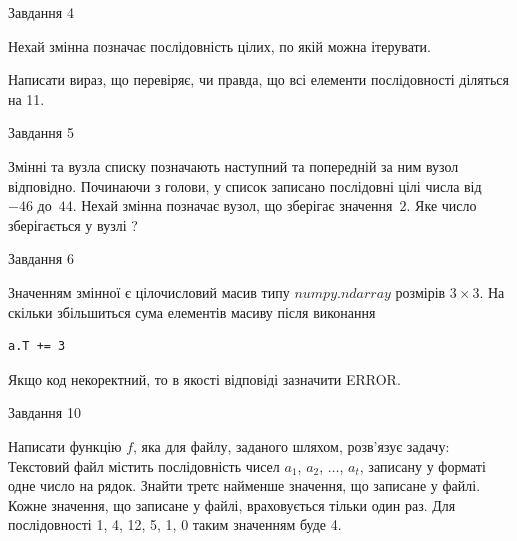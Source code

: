 \documentclass[12pt, ukrainian]{article}
\begin{document}
{\begin{minipage}[t]{8.0cm}
\end{minipage}


               
{\begin{center}Завдання {4}\end{center}}
\vspace{-4mm}
Нехай змінна  позначає послідовність цілих, по якій можна ітерувати.

Написати вираз, що перевіряє, чи правда, що всі елементи послідовності діляться на 11.\par

\vspace{10mm}
               
{\begin{center}Завдання {5}\end{center}}
\vspace{-4mm}
Змінні  та  вузла списку позначають наступний та попередній за ним вузол відповідно. Починаючи з голови, у список записано послідовні цілі числа від~$-46$ до~$44$. Нехай змінна  позначає вузол, що зберігає значення~$2$.
Яке число зберігається у вузлі  ?\par

               
{\begin{center}Завдання {6}\end{center}}
\vspace{-4mm}
Значенням змінної  є цілочисловий масив типу $numpy.ndarray$ розмірів $3{\times}3$. На скільки збільшиться сума елементів масиву  після виконання
\begin{verbatim}
a.T += 3
\end{verbatim}


Якщо код некоректний, то в якості відповіді зазначити ERROR.\par

               
{\begin{center}Завдання {10}\end{center}}
\vspace{-4mm}

Написати функцію $f$, яка для файлу, заданого шляхом, розв’язує задачу:\\ Текстовий файл містить послідовність чисел $a_1$, $a_2$, $\ldots$, $a_t$, записану у форматі одне число на рядок. Знайти третє найменше значення, що записане у файлі. Кожне значення, що записане у файлі, враховується тільки один раз. Для послідовності 1, 4, 12, 5, 1, 0 таким значенням буде 4.

}
\end{document}
